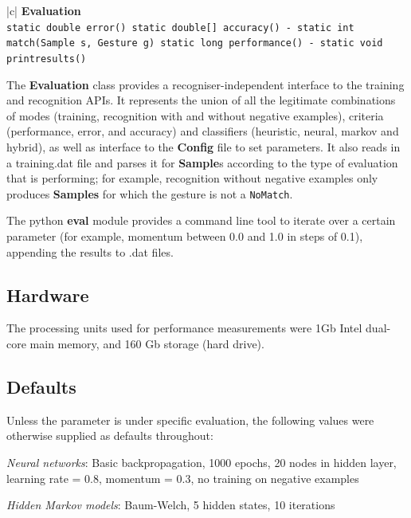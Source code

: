 \documentclass[12pt,a4,notitlepage]{report}
\renewcommand{\_}{\texttt{\symbol{95}}}
\newcommand{\<}{\texttt{\symbol{60}}}
\renewcommand{\>}{\texttt{\symbol{62}}}
\newcommand{\class}[1]{\textbf{#1}}
\newcommand{\variable}[1]{\texttt{#1}}
\begin{document}
\begin{tabular}{|c|} \hline 
\class{Evaluation} \\ \hline
{}
{\variable{static double error() \newline
static double[] accuracy() \newline
- static int match(Sample s, Gesture g) \newline
static long performance() \newline
- static void print\_results()
} } \\ \hline
\end{tabular}

The \class{Evaluation} class provides a recogniser-independent interface to the training and recognition APIs. It represents the union of all the legitimate combinations of modes (training, recognition with and without negative examples), criteria (performance, error, and accuracy) and classifiers (heuristic, neural, markov and hybrid), as well as interface to the \class{Config} file to set parameters. It also reads in a training.dat file and parses it for \class{Sample}s according to the type of evaluation that is performing; for example, recognition without negative examples only produces \class{Samples} for which the gesture is not a \variable{NoMatch}.

The python \class{eval} module provides a command line tool to iterate over a certain parameter (for example, momentum between 0.0 and 1.0 in steps of 0.1), appending the results to .dat files.

\subsection{Hardware}

The processing units used for performance measurements were 1Gb Intel dual-core main memory, and 160 Gb storage (hard drive).

\subsection{Defaults}

Unless the parameter is under specific evaluation, the following values were otherwise supplied as defaults throughout:

\textit{Neural networks}: Basic backpropagation, 1000 epochs, 20 nodes in hidden layer, learning rate = 0.8, momentum = 0.3, no training on negative examples

\textit{Hidden Markov models}: Baum-Welch, 5 hidden states, 10 iterations
\end{document}
